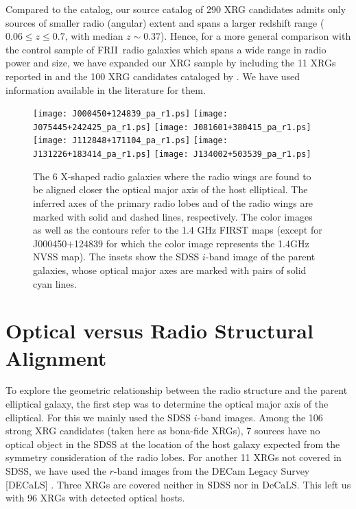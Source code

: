 \documentclass[twocolumn]{aastex62}
\def\frii{FR{II}~}
\begin{document}
 Compared to the \citet{Cheung2007AJ....133.2097C} catalog, 
our source catalog of 290 XRG candidates admits only sources of smaller 
radio (angular) extent and spans a larger redshift range ($0.06 
\le z \le 0.7$, with median $z \sim 0.37$). Hence, for a more general 
comparison with the control sample of \frii radio galaxies which spans 
a wide range in radio power and size, we have expanded our XRG sample 
by including the 11 XRGs reported in \citet{Leahy1992ersf.meet..307L} 
and the 100 XRG candidates cataloged by \citet{Cheung2007AJ....133.2097C}.
We have used information available in the literature for them.

 \begin{figure*}
  \centering
\texttt{[image: J000450+124839\_pa\_r1.ps]} 
\texttt{[image: J075445+242425\_pa\_r1.ps]} 
\texttt{[image: J081601+380415\_pa\_r1.ps]} 
\texttt{[image: J112848+171104\_pa\_r1.ps]} 
\texttt{[image: J131226+183414\_pa\_r1.ps]} 
\texttt{[image: J134002+503539\_pa\_r1.ps]} 
  \caption{The 6 X-shaped radio galaxies where the radio wings are found 
  to be aligned closer the optical major axis of the host elliptical. The
  inferred axes of the primary radio lobes and of the radio wings are
  marked with solid and dashed lines, respectively. The color images as 
  well as the contours refer to the 1.4 GHz FIRST maps (except
  for J000450$+$124839 for which the color image represents the 1.4GHz NVSS 
  map). The insets show the SDSS $i$-band image of the parent galaxies,
  whose optical major axes are marked with pairs of solid cyan lines.}
\label{fig:pa_back}
 \end{figure*}


\section{Optical versus Radio Structural Alignment}
\label{sec:opt_vs_radio_str}
To explore the geometric relationship between the radio structure and
the parent elliptical galaxy, the first step was to determine the
optical major axis of the elliptical. For this we mainly used the SDSS
$i$-band images. Among the 106 strong XRG candidates (taken here as
bona-fide XRGs), 7 sources have no optical object in the SDSS at the
location of the host galaxy expected from the symmetry consideration
of the radio lobes. For another 11 XRGs not covered in SDSS, we have
used the $r$-band images from the DECam Legacy Survey [DECaLS]
\citep{Dey2018arXiv180408657D}. Three XRGs are covered neither in SDSS
nor in DeCaLS. This left us with 96 XRGs with detected optical hosts.
\end{document}
